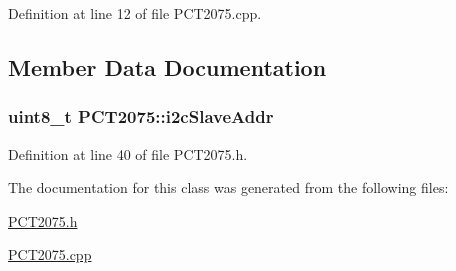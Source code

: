 Definition at line 12 of file P\+C\+T2075.\+cpp.



\subsection{Member Data Documentation}
\subsubsection[{\texorpdfstring{i2c\+Slave\+Addr}{i2cSlaveAddr}}]{\setlength{\rightskip}{0pt plus 5cm}uint8\+\_\+t P\+C\+T2075\+::i2c\+Slave\+Addr\hspace{0.3cm}{\ttfamily [private]}}\hypertarget{class_p_c_t2075_a573c2a7938067f7d5f7050b396ec6889}{}\label{class_p_c_t2075_a573c2a7938067f7d5f7050b396ec6889}


Definition at line 40 of file P\+C\+T2075.\+h.



The documentation for this class was generated from the following files\+:\begin{DoxyCompactItemize}
\item 
\hyperlink{_p_c_t2075_8h}{P\+C\+T2075.\+h}\item 
\hyperlink{_p_c_t2075_8cpp}{P\+C\+T2075.\+cpp}\end{DoxyCompactItemize}
